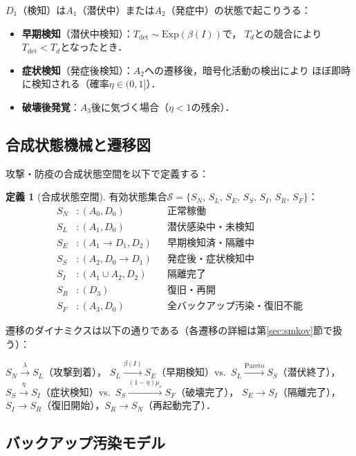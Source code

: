 \documentclass[12pt,a4paper]{article}
\theoremstyle{plain}
\theoremstyle{definition}
\newtheorem{definition}[theorem]{定義}
\theoremstyle{remark}
\newcommand{\betaI}{\beta(I)}
\begin{document}
$D_1$（検知）は$A_1$（潜伏中）または$A_2$（発症中）の状態で起こりうる：
\begin{itemize}
\item \textbf{早期検知}（潜伏中検知）：$T_{\mathrm{det}}\sim\mathrm{Exp}(\betaI)$で，
  $T_d$との競合により$T_{\mathrm{det}}<T_d$となったとき．
\item \textbf{症状検知}（発症後検知）：$A_2$への遷移後，暗号化活動の検出により
  ほぼ即時に検知される（確率$\eta\in(0,1]$）．
\item \textbf{破壊後発覚}：$A_3$後に気づく場合（$\eta<1$の残余）．
\end{itemize}

\subsection{合成状態機械と遷移図}

攻撃・防疫の合成状態空間を以下で定義する：

\begin{definition}[合成状態空間]\label{def:composite}
有効状態集合$\mathcal S=\{S_N,\,S_L,\,S_E,\,S_S,\,S_I,\,S_R,\,S_F\}$：
\begin{align*}
  S_N &: (A_0,D_0)&& \text{正常稼働}\\
  S_L &: (A_1,D_0)&& \text{潜伏感染中・未検知}\\
  S_E &: (A_1\to D_1,D_2)&& \text{早期検知済・隔離中}\\
  S_S &: (A_2,D_0\to D_1)&& \text{発症後・症状検知中}\\
  S_I &: (A_1\cup A_2,D_2)&& \text{隔離完了}\\
  S_R &: (D_3)&& \text{復旧・再開}\\
  S_F &: (A_3,D_0)&& \text{全バックアップ汚染・復旧不能}
\end{align*}
\end{definition}

遷移のダイナミクスは以下の通りである（各遷移の詳細は第\ref{sec:smkov}節で扱う）：

$S_N\xrightarrow{\lambda}S_L$（攻撃到着），
$S_L\xrightarrow{\betaI}S_E$（早期検知）vs.~$S_L\xrightarrow{\mathrm{Pareto}}S_S$（潜伏終了），
$S_S\xrightarrow{\eta}S_I$（症状検知）vs.~$S_S\xrightarrow{(1-\eta)\mu_e}S_F$（破壊完了），
$S_E\to S_I$（隔離完了），$S_I\to S_R$（復旧開始），$S_R\to S_N$（再起動完了）．

\subsection{バックアップ汚染モデル}
\end{document}
